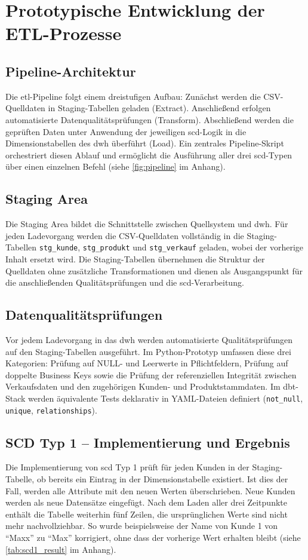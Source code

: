 \documentclass[a4paper,11pt]{article}
\begin{document}
\section{Prototypische Entwicklung der ETL-Prozesse}

\subsection{Pipeline-Architektur}
Die \gls{etl}-Pipeline folgt einem dreistufigen Aufbau: Zunächst werden die CSV-Quelldaten in Staging-Tabellen geladen 
(Extract). Anschließend erfolgen automatisierte Datenqualitätsprüfungen (Transform). Abschließend werden die geprüften 
Daten unter Anwendung der jeweiligen \gls{scd}-Logik in die Dimensionstabellen des \gls{dwh} überführt (Load). 
Ein zentrales Pipeline-Skript orchestriert diesen Ablauf und ermöglicht die Ausführung aller drei \gls{scd}-Typen über einen einzelnen Befehl (siehe \cref{fig:pipeline} im Anhang).

\subsection{Staging Area}
Die Staging Area bildet die Schnittstelle zwischen Quellsystem und \gls{dwh}. Für jeden 
Ladevorgang werden die CSV-Quelldaten vollständig in die Staging-Tabellen \texttt{stg\_kunde}, 
\texttt{stg\_produkt} und \texttt{stg\_verkauf} geladen, wobei der vorherige Inhalt ersetzt wird. 
Die Staging-Tabellen übernehmen die Struktur der Quelldaten ohne zusätzliche Transformationen und 
dienen als Ausgangspunkt für die anschließenden Qualitätsprüfungen und die \gls{scd}-Verarbeitung.

\subsection{Datenqualitätsprüfungen}
Vor jedem Ladevorgang in das \gls{dwh} werden automatisierte Qualitätsprüfungen auf den Staging-Tabellen 
ausgeführt. Im Python-Prototyp umfassen diese drei Kategorien: Prüfung auf NULL- und Leerwerte in Pflichtfeldern, 
Prüfung auf doppelte Business Keys sowie die Prüfung der referenziellen Integrität zwischen Verkaufsdaten und 
den zugehörigen Kunden- und Produktstammdaten. Im dbt-Stack werden äquivalente Tests deklarativ in YAML-Dateien 
definiert (\texttt{not\_null}, \texttt{unique}, \texttt{relationships}).

\subsection{SCD Typ 1 -- Implementierung und Ergebnis}
Die Implementierung von \gls{scd} Typ 1 prüft für jeden Kunden in der Staging-Tabelle, ob bereits ein 
Eintrag in der Dimensionstabelle existiert. Ist dies der Fall, werden alle Attribute mit den neuen Werten 
überschrieben. Neue Kunden werden als neue Datensätze eingefügt. Nach dem Laden aller drei Zeitpunkte enthält 
die Tabelle weiterhin fünf Zeilen, die ursprünglichen Werte sind nicht mehr nachvollziehbar. So wurde 
beispielsweise der Name von Kunde 1 von \enquote{Maxx} zu \enquote{Max} korrigiert, ohne dass der vorherige Wert erhalten bleibt (siehe \cref{tab:scd1_result} im Anhang).
\end{document}
